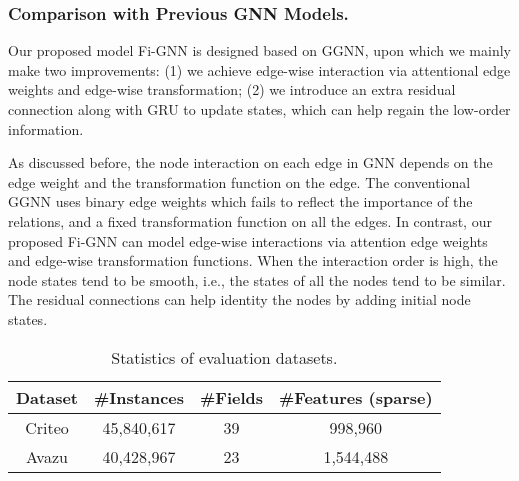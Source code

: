 \documentclass[sigconf]{acmart}
\begin{document}
\subsubsection{\textbf{Comparison with Previous GNN Models.}}
Our proposed model Fi-GNN is designed based on GGNN, upon which we mainly make two improvements:
(1) we achieve edge-wise interaction via attentional edge weights and edge-wise transformation;
(2) we introduce an extra residual connection along with GRU to update states, which can help regain the low-order information.

As discussed before, the node interaction on each edge in GNN depends on the edge weight and the transformation function on the edge.
The conventional GGNN uses binary edge weights which fails to reflect the importance of the relations, and a fixed transformation function on all the edges. 
In contrast, our proposed Fi-GNN can model edge-wise interactions via attention edge weights and edge-wise transformation functions.
When the interaction order is high, the node states tend to be smooth, i.e., the states of all the nodes tend to be similar.
The residual connections can help identity the nodes by adding initial node states.

\begin{table}[h]
\centering\caption{Statistics of evaluation datasets.}
\begin{tabular}{cccc} 
\hline
Dataset & \#Instances & \#Fields & \#Features (sparse)  \\
\hline
Criteo & 45,840,617 & 39 & 998,960 \\
Avazu & 40,428,967 & 23 & 1,544,488 \\
\hline
\end{tabular}\label{tab::dataset}
\end{table}
  
\end{document}
